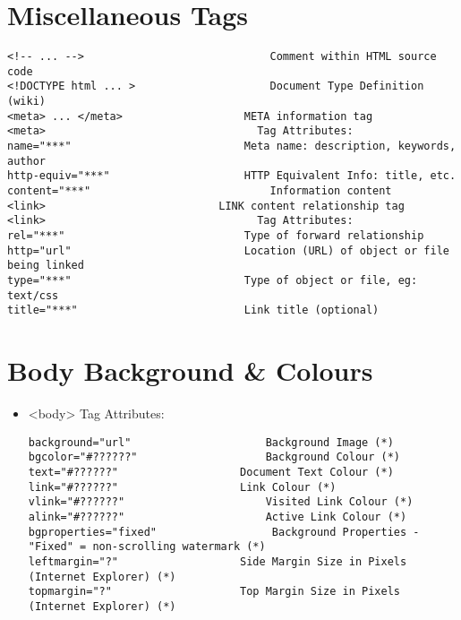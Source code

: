 \documentclass[11pt]{article}
\begin{document}
\section*{Miscellaneous Tags}
\label{sec:orge623109}
\begin{verbatim}
<!-- ... -->	                         Comment within HTML source code
<!DOCTYPE html ... >	                 Document Type Definition (wiki)
<meta> ... </meta>	                 META information tag
<meta>                                 Tag Attributes:	 
name="***"	                         Meta name: description, keywords, author
http-equiv="***"	                 HTTP Equivalent Info: title, etc.
content="***"	                         Information content
<link>	                         LINK content relationship tag
<link>                                 Tag Attributes:	 
rel="***"	                         Type of forward relationship
http="url"	                         Location (URL) of object or file being linked
type="***"	                         Type of object or file, eg: text/css
title="***"	                         Link title (optional)

\end{verbatim}
\section*{Body Background \& Colours}
\label{sec:orgba8bb6f}
\begin{itemize}
\item <body> Tag Attributes:	 
\begin{verbatim}
background="url"	                 Background Image (*)
bgcolor="#??????" 	                 Background Colour (*)
text="#??????" 	                 Document Text Colour (*)
link="#??????" 	                 Link Colour (*)
vlink="#??????" 	                 Visited Link Colour (*)
alink="#??????" 	                 Active Link Colour (*)
bgproperties="fixed"                  Background Properties - "Fixed" = non-scrolling watermark (*)
leftmargin="?" 	                 Side Margin Size in Pixels (Internet Explorer) (*)
topmargin="?" 	                 Top Margin Size in Pixels (Internet Explorer) (*)
\end{verbatim}
\end{itemize}
\end{document}
